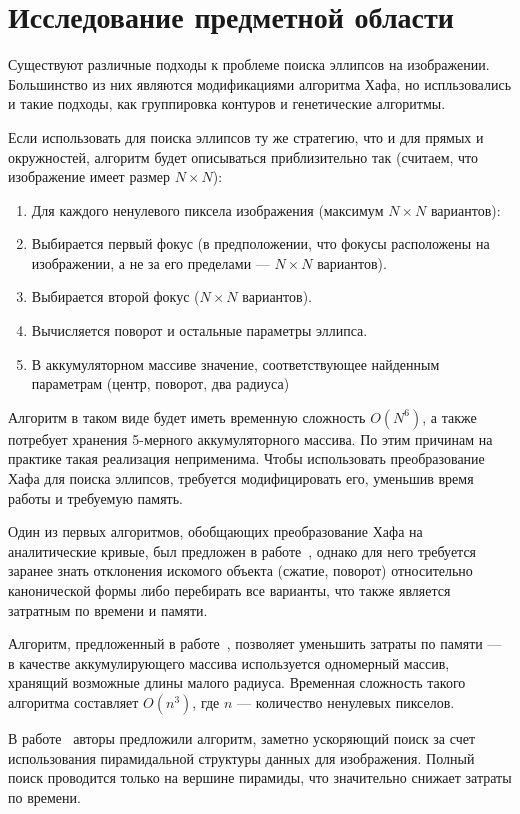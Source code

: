 \section{Исследование предметной области}
Существуют различные подходы к проблеме поиска эллипсов на изображении.  Большинство из них являются модификациями алгоритма Хафа, 
но испльзовались и такие подходы, как группировка контуров и генетические алгоритмы.

Если использовать для поиска эллипсов ту же стратегию, что и для прямых и окружностей, алгоритм будет описываться приблизительно так (считаем, что изображение имеет размер $N \times N$):
\begin{enumerate}
\item Для каждого ненулевого пиксела изображения (максимум $N \times N$ вариантов):
\item Выбирается первый фокус (в предположении, что фокусы расположены на изображении, а не за его пределами --- $N \times N$ вариантов).
\item Выбирается второй фокус ($N \times N$ вариантов).
\item Вычисляется поворот и остальные параметры эллипса.
\item В аккумуляторном массиве значение, соответствующее найденным параметрам (центр, поворот, два радиуса)
\end{enumerate}

Алгоритм в таком виде будет иметь временную сложность \(O(N^6)\), а также потребует хранения 5-мерного аккумуляторного массива. По этим причинам на практике такая реализация неприменима.
Чтобы использовать преобразование Хафа для поиска эллипсов, требуется модифицировать его, уменьшив время работы и требуемую память.

Один из первых алгоритмов, обобщающих преобразование Хафа на аналитические кривые, был предложен в работе~\autocite{Ballard}, 
однако для него требуется заранее знать отклонения искомого объекта (сжатие, поворот) относительно канонической формы либо перебирать все варианты, что также является затратным по времени и памяти.

Алгоритм, предложенный в работе~\autocite{OneDim}, позволяет уменьшить затраты по памяти --- в качестве аккумулирующего массива используется одномерный массив, хранящий возможные длины малого радиуса.
Временная сложность такого алгоритма составляет \(O(n^3)\), где \(n\) --- количество ненулевых пикселов.

В работе~\autocite{Chien} авторы предложили алгоритм, заметно ускоряющий поиск за счет использования пирамидальной структуры данных для изображения. 
Полный поиск проводится только на вершине пирамиды, что значительно снижает затраты по времени.

